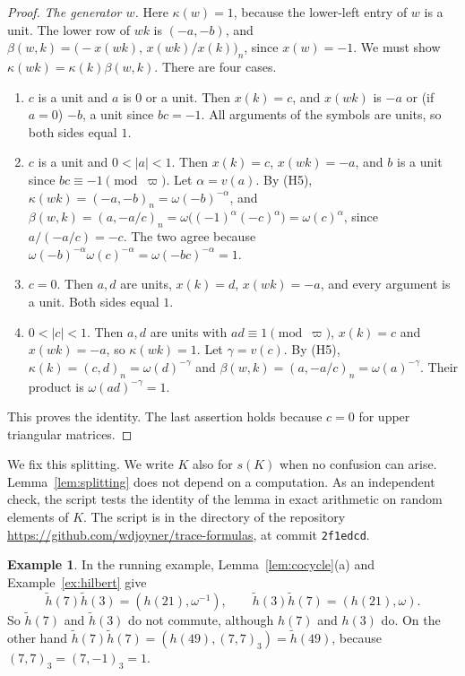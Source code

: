 \documentclass[12pt,letterpaper]{article}
\numberwithin{equation}{section}
\theoremstyle{plain}
\theoremstyle{definition}
\newtheorem{example}[theorem]{Example}
\theoremstyle{remark}
\newcommand{\hl}{\tilde h}
\begin{document}
\begin{proof}
\emph{The generator $w$.} Here $\kappa(w)=1$, because the lower-left
entry of $w$ is a unit. The lower row of $wk$ is $(-a,-b)$, and
$\beta(w,k)=\bigl(-x(wk),\,x(wk)/x(k)\bigr)_n$, since $x(w)=-1$. We
must show $\kappa(wk)=\kappa(k)\beta(w,k)$. There are four cases.
\begin{enumerate}[label=(\roman*),leftmargin=*]
\item $c$ is a unit and $a$ is $0$ or a unit. Then $x(k)=c$, and
  $x(wk)$ is $-a$ or (if $a=0$) $-b$, a unit since $bc=-1$. All
  arguments of the symbols are units, so both sides equal $1$.
\item $c$ is a unit and $0<|a|<1$. Then $x(k)=c$, $x(wk)=-a$, and $b$ is
  a unit since $bc\equiv-1\pmod\varpi$. Let $\alpha=v(a)$. By (H5),
  $\kappa(wk)=(-a,-b)_n=\omega(-b)^{-\alpha}$, and
  $\beta(w,k)=(a,-a/c)_n=\omega\bigl((-1)^{\alpha}(-c)^{\alpha}\bigr)
  =\omega(c)^{\alpha}$, since $a/(-a/c)=-c$. The two agree because
  $\omega(-b)^{-\alpha}\omega(c)^{-\alpha}=\omega(-bc)^{-\alpha}=1$.
\item $c=0$. Then $a,d$ are units, $x(k)=d$, $x(wk)=-a$, and every
  argument is a unit. Both sides equal $1$.
\item $0<|c|<1$. Then $a,d$ are units with $ad\equiv1\pmod\varpi$,
  $x(k)=c$ and $x(wk)=-a$, so $\kappa(wk)=1$. Let $\gamma=v(c)$. By
  (H5), $\kappa(k)=(c,d)_n=\omega(d)^{-\gamma}$ and
  $\beta(w,k)=(a,-a/c)_n=\omega(a)^{-\gamma}$. Their product is
  $\omega(ad)^{-\gamma}=1$.
\end{enumerate}
This proves the identity. The last assertion holds because $c=0$ for
upper triangular matrices.
\end{proof}

We fix this splitting. We write $K$ also for $s(K)$ when no confusion
can arise. Lemma~\ref{lem:splitting} does not depend on a computation.
As an independent check, the script
 tests the identity of the lemma in
exact arithmetic on random elements of $K$. The script is in the
directory  of the repository
\url{https://github.com/wdjoyner/trace-formulas}, at commit
\texttt{2f1edcd}.

\begin{example}\label{ex:noncommute}
In the running example, Lemma~\ref{lem:cocycle}(a) and
Example~\ref{ex:hilbert} give
\[
\hl(7)\hl(3)=(h(21),\omega^{-1}),\qquad
\hl(3)\hl(7)=(h(21),\omega).
\]
So $\hl(7)$ and $\hl(3)$ do not commute, although $h(7)$ and $h(3)$
do. On the other hand $\hl(7)\hl(7)=(h(49),(7,7)_3)=\hl(49)$, because
$(7,7)_3=(7,-1)_3=1$.
\end{example}
\end{document}
